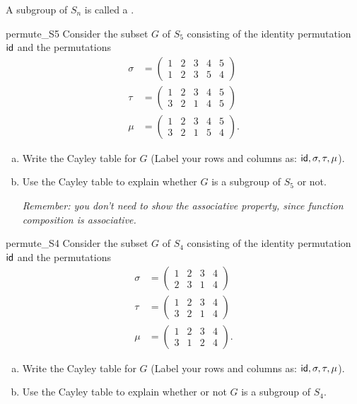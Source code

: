 \begin{defn}
A subgroup of $S_n$ is called a .
\end{defn}

\begin{exercise}{permute_S5}
Consider the subset $G$ of $S_5$ consisting of the identity
permutation ${\sf{i}d}$ and the permutations 
\begin{align*}
\sigma
& =
\begin{pmatrix}
1 & 2 & 3 & 4 & 5 \\
1 & 2 & 3 & 5 & 4
\end{pmatrix} \\
\tau
& =
\begin{pmatrix}
1 & 2 & 3 & 4 & 5 \\
3 & 2 & 1 & 4 & 5
\end{pmatrix} \\
\mu
& =
\begin{pmatrix}
1 & 2 & 3 & 4 & 5 \\
3 & 2 & 1 & 5 & 4
\end{pmatrix}.
\end{align*}
\begin{enumerate}[(a)]
\item
Write the Cayley table for $G$ (Label your rows and columns as: ${\sf{i}d}, \sigma, \tau, \mu$).
\item
Use the Cayley table to explain whether $G$ is a subgroup of $S_5$ or not.  

\medskip
\emph{Remember: you don't need to show the associative property, since function composition is associative.}
\end{enumerate}
\end{exercise}

\begin{exercise}{permute_S4}
Consider the subset $G$ of $S_4$ consisting of the identity
permutation ${\sf{i}d}$ and the permutations 
\begin{align*}
\sigma
& =
\begin{pmatrix}
1 & 2 & 3 & 4  \\
2 & 3 & 1 & 4
\end{pmatrix} \\
\tau
& =
\begin{pmatrix}
1 & 2 & 3 & 4  \\
3 & 2 & 1 & 4 
\end{pmatrix} \\
\mu
& =
\begin{pmatrix}
1 & 2 & 3 & 4  \\
3 & 1 & 2 & 4 
\end{pmatrix}.
\end{align*}
\begin{enumerate}[(a)]
\item
Write the Cayley table for $G$ (Label your rows and columns as: ${\sf{i}d}, \sigma, \tau, \mu$).
\item
Use the Cayley table to explain whether or not $G$ is a subgroup of $S_4$.
\end{enumerate}
\end{exercise}

